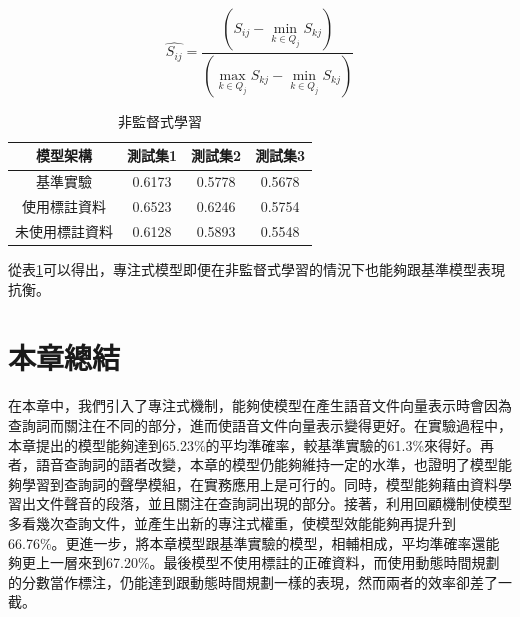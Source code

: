 \begin{equation}
\label{norm}
\hat{S_{ij}} = \frac{(S_{ij}- \min_{k \in Q_j} S_{kj})} { (\max_{k \in
		Q_j} S_{kj} - \min_{k \in Q_j} S_{kj})}
\end{equation}
\begin{table}[ht]
	 \centering
	 \caption{非監督式學習}
	 \label{table:ch4_unsup}
	 \begin{tabular}{|c|c|c|c|c|}
		 \hline
		 \multicolumn{2}{|c|}{模型架構} & 測試集1 & 測試集2 & 測試集3 \\
		 \hline
		 \multicolumn{2}{|c|}{基準實驗} & 0.6173 & 0.5778 & 0.5678\\
		 \hline
		 \multicolumn{2}{|c|}{使用標註資料} &0.6523&0.6246 &0.5754 \\
		 \hline
		 \multicolumn{2}{|c|}{未使用標註資料} &0.6128&0.5893 &0.5548 \\
		 \hline
	   \end{tabular}
\end{table}

從表\ref{table:ch4_unsup}可以得出，專注式模型即便在非監督式學習的情況下也能夠跟基準模型表現抗衡。
\vspace{10cm}
\section{本章總結}
在本章中，我們引入了專注式機制，能夠使模型在產生語音文件向量表示時會因為查詢詞而關注在不同的部分，進而使語音文件向量表示變得更好。在實驗過程中，本章提出的模型能夠達到65.23\%的平均準確率，較基準實驗的61.3\%來得好。再者，語音查詢詞的語者改變，本章的模型仍能夠維持一定的水準，也證明了模型能夠學習到查詢詞的聲學模組，在實務應用上是可行的。同時，模型能夠藉由資料學習出文件聲音的段落，並且關注在查詢詞出現的部分。接著，利用回顧機制使模型多看幾次查詢文件，並產生出新的專注式權重，使模型效能能夠再提升到66.76\%。更進一步，將本章模型跟基準實驗的模型，相輔相成，平均準確率還能夠更上一層來到67.20\%。最後模型不使用標註的正確資料，而使用動態時間規劃的分數當作標注，仍能達到跟動態時間規劃一樣的表現，然而兩者的效率卻差了一截。



